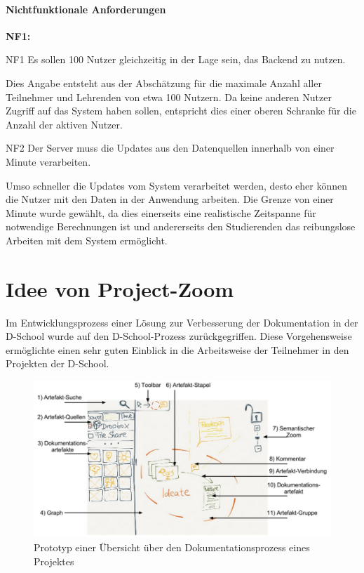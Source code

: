 \paragraph{Nichtfunktionale Anforderungen}
\label{sec:nonfunctional}

\begin{labeling}{\textbf{NF1:}}
  \item[NF1\label{itm:nf1}] Es sollen 100 Nutzer gleichzeitig in der Lage sein, das Backend zu nutzen.

  Dies Angabe entsteht aus der Abschätzung für die maximale Anzahl aller Teilnehmer und Lehrenden von etwa 100 Nutzern. Da keine anderen Nutzer Zugriff auf das System haben sollen, entspricht dies einer oberen Schranke für die Anzahl der aktiven Nutzer. 

  \item[NF2\label{itm:nf2}]  Der Server muss die Updates aus den Datenquellen innerhalb von einer Minute verarbeiten.

  Umso schneller die Updates vom System verarbeitet werden, desto eher können die Nutzer mit den Daten in der Anwendung arbeiten. Die Grenze von einer Minute wurde gewählt, da dies einerseits eine realistische Zeitspanne für notwendige Berechnungen ist und andererseits den Studierenden das reibungslose Arbeiten mit dem System ermöglicht.
\end{labeling}


\section{Idee von Project-Zoom}
 
Im Entwicklungsprozess einer Lösung zur Verbesserung der Dokumentation in der D-School wurde auf den D-School-Prozess zurückgegriffen. Diese Vorgehensweise ermöglichte einen sehr guten Einblick in die Arbeitsweise der Teilnehmer in den Projekten der D-School. 

\begin{figure}[ht]  
  \centering     
  \includegraphics[width=1.0\textwidth]{img/projectzoom_prototype.png}  
   \caption{Prototyp einer Übersicht über den Dokumentationsprozess eines Projektes}
  \label{fig:projectzoom_prototype} 
\end{figure}

